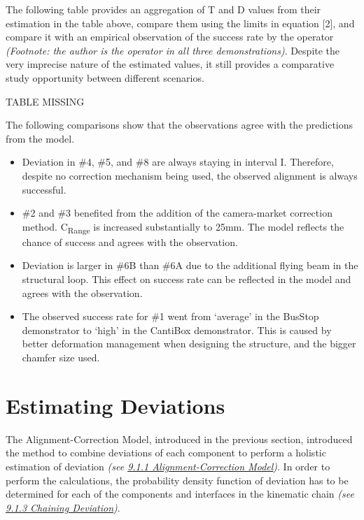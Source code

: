 \vspace{1\baselineskip}
The following table provides an aggregation of T and D values from their estimation in the table above, compare them using the limits in equation [2], and compare it with an empirical observation of the success rate by the operator \textit{(Footnote: the author is the operator in all three demonstrations)}. Despite the very imprecise nature of the estimated values, it still provides a comparative study opportunity between different scenarios.

{\footnotesize TABLE MISSING}

\vspace{1\baselineskip}
The following comparisons show that the observations agree with the predictions from the model.

\begin{itemize}
	\item Deviation in $\#$4, $\#$5, and $\#$8 are always staying in interval I. Therefore, despite no correction mechanism being used, the observed alignment is always successful. 

	\item $\#$2 and $\#$3 benefited from the addition of the camera-market correction method. C\textsubscript{Range} is increased substantially to 25mm. The model reflects the chance of success and agrees with the observation.

	\item Deviation is larger in $\#$6B than $\#$6A due to the additional flying beam in the structural loop. This effect on success rate can be reflected in the model and agrees with the observation.

	\item The observed success rate for $\#$1 went from ‘average’ in the BusStop demonstrator to ‘high’ in the CantiBox demonstrator. This is caused by better deformation management when designing the structure, and the bigger chamfer size used. 

\end{itemize}

\section{Estimating Deviations}

The Alignment-Correction Model, introduced in the previous section, introduced the method to combine deviations of each component to perform a holistic estimation of deviation \textit{(see \ul{9.1.1 Alignment-Correction Model})}. In order to perform the calculations, the probability density function of deviation has to be determined for each of the components and interfaces in the kinematic chain \textit{(see \ul{9.1.3 Chaining Deviation})}.

